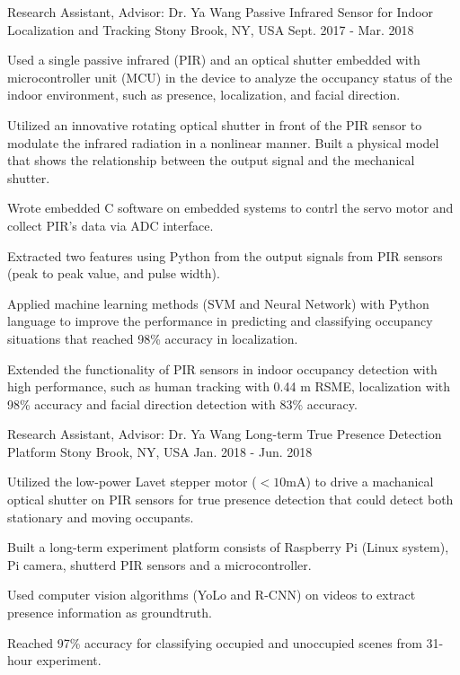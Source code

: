 \begin{cventries}
\cventry
{Research Assistant, Advisor: Dr. Ya Wang} %
{Passive Infrared Sensor for Indoor Localization and Tracking} %
{Stony Brook, NY, USA} %
{Sept. 2017 - Mar. 2018} %
{
  \begin{cvitems} %
    \item Used a single passive infrared (PIR) and an optical shutter embedded with microcontroller unit (MCU) in the device to analyze the occupancy status of the indoor environment, such as presence, localization, and facial direction. 
    \item Utilized an innovative rotating optical shutter in front of the PIR sensor to modulate the infrared radiation in a nonlinear manner. Built a physical model that shows the relationship between the output signal and the mechanical shutter.
    \item Wrote embedded C software on embedded systems to contrl the servo motor and collect PIR's data via ADC interface.
    \item Extracted two features using Python from the output signals from PIR sensors (peak to peak value, and pulse width). 
    \item Applied machine learning methods (SVM and Neural Network) with Python language to improve the performance in predicting and classifying occupancy situations that reached 98\% accuracy in localization.  
    \item Extended the functionality of PIR sensors in indoor occupancy detection with high performance, such as human tracking with 0.44 m RSME, localization with 98\% accuracy and facial direction detection with 83\% accuracy. 
  \end{cvitems}
}

  \cventry
    {Research Assistant, Advisor: Dr. Ya Wang} %
    {Long-term True Presence Detection Platform} %
    {Stony Brook, NY, USA} %
    {Jan. 2018 - Jun. 2018} %
    {
      \begin{cvitems} %
        \item Utilized the low-power Lavet stepper motor ($<10$mA) to drive a machanical optical shutter on PIR 
        sensors for true presence detection that could detect both stationary and moving occupants.
        \item Built a long-term experiment platform consists of Raspberry Pi (Linux system), Pi camera, shutterd PIR sensors and a microcontroller.
        \item Used computer vision algorithms (YoLo and R-CNN) on videos to extract presence information as groundtruth.
        \item Reached 97\% accuracy for classifying occupied and unoccupied scenes from 31-hour experiment.
      \end{cvitems}
    }


\end{cventries}
